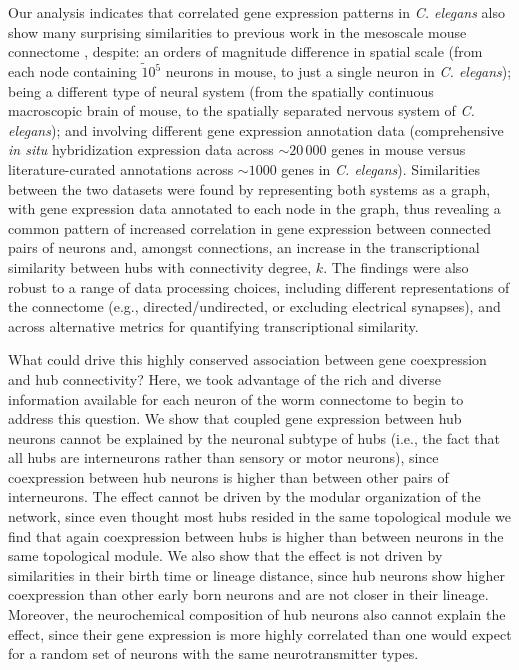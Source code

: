 \documentclass[10pt,letterpaper]{article}
\begin{document}
{%
Our analysis indicates that correlated gene expression patterns in \emph{C. elegans} also show many surprising similarities to previous work in the mesoscale mouse connectome \cite{Fulcher:2016ck}, despite:
an orders of magnitude difference in spatial scale (from each node containing $\tilde 10^5$ neurons in mouse, to just a single neuron in \emph{C. elegans});
being a different type of neural system (from the spatially continuous macroscopic brain of mouse, to the spatially separated nervous system of \emph{C. elegans});
and involving different gene expression annotation data (comprehensive \emph{in situ} hybridization expression data across $\sim20\,000$ genes in mouse versus literature-curated annotations across $\sim 1000$ genes in \emph{C. elegans}).
Similarities between the two datasets were found by representing both systems as a graph, with gene expression data annotated to each node in the graph, thus revealing a common pattern of increased correlation in gene expression between connected pairs of neurons and, amongst connections, an increase in the transcriptional similarity between hubs with connectivity degree, $k$.
The findings were also robust to a range of data processing choices, including different representations of the connectome (e.g., directed/undirected, or excluding electrical synapses), and across alternative metrics for quantifying transcriptional similarity.

What could drive this highly conserved association between gene coexpression and hub connectivity? Here, we took advantage of the rich and diverse information available for each neuron of the worm connectome to begin to address this question. 
We show that coupled gene expression between hub neurons cannot be explained by the neuronal subtype of hubs (i.e., the fact that all hubs are interneurons rather than  sensory or motor neurons), since coexpression between hub neurons is higher than between other pairs of interneurons.
The effect cannot be driven by the modular organization of the network, since even thought most hubs resided in the same topological module we find that again coexpression between hubs is higher than between neurons in the same topological module. 
We also show that the effect is not driven by similarities in their birth time or lineage distance, since hub neurons show higher coexpression than other early born neurons and are not closer in their lineage. 
Moreover, the neurochemical composition of hub neurons also cannot explain the effect, since their gene expression is more highly correlated than one would expect for a random set of neurons with the same neurotransmitter types.

}
\end{document}
